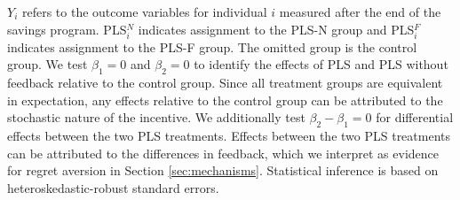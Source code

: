 \documentclass[12pt]{article}
\begin{document}
		$Y_{i}$ refers to the outcome variables for individual $i$ measured after the end of the savings program. PLS$^N_i$ indicates assignment to the PLS-N group and PLS$^F_i$ indicates assignment to the PLS-F group. The omitted group is the control group. We test $\beta_{1} = 0$ and $\beta_{2} = 0$ to identify the effects of PLS and PLS without feedback relative to the control group. Since all treatment groups are equivalent in expectation, any effects relative to the control group can be attributed to the stochastic nature of the incentive. We additionally test $\beta_{2} - \beta_{1} = 0$ for differential effects between the two PLS treatments. Effects between the two PLS treatments can be attributed to the differences in feedback, which we interpret as evidence for regret aversion in Section \ref{sec:mechanisms}. Statistical inference is based on heteroskedastic-robust standard errors.



\end{document}
